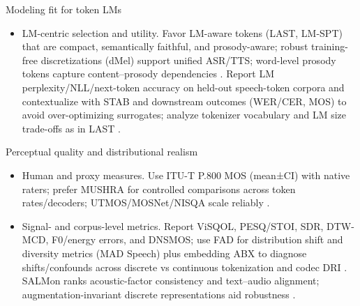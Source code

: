 \documentclass{article}
\begin{document}
Modeling fit for token LMs
\begin{itemize}
  \item LM-centric selection and utility. Favor LM-aware tokens (LAST, LM-SPT) that are compact, semantically faithful, and prosody-aware; robust training-free discretizations (dMel) support unified ASR/TTS; word-level prosody tokens capture content--prosody dependencies \cite{turetzky2024lastlanguagemodelawarespeechtokenization,jo2025lmsptalignedsemanticdistillationspeechto,bai2025dmelspeechtokenizationmadesimple,qian2025prosodylmuncoveringemergingprosodyproces}. Report LM perplexity/NLL/next-token accuracy on held-out speech-token corpora and contextualize with STAB and downstream outcomes (WER/CER, MOS) to avoid over-optimizing surrogates; analyze tokenizer vocabulary and LM size trade-offs as in LAST \cite{vashishth2024stabspeechtokenizerassessmentbenchmark,turetzky2024lastlanguagemodelawarespeechtokenization}.
\end{itemize}

Perceptual quality and distributional realism
\begin{itemize}
  \item Human and proxy measures. Use ITU-T P.800 MOS (mean±CI) with native raters; prefer MUSHRA for controlled comparisons across token rates/decoders; UTMOS/MOSNet/NISQA scale reliably \cite{nakata2024jchatjapaneselargescalespokendialoguecor,yang2025diffsoundstreamefficientspeechtokenizati}.
  \item Signal- and corpus-level metrics. Report ViSQOL, PESQ/STOI, SDR, DTW-MCD, F0/energy errors, and DNSMOS; use FAD for distribution shift and diversity metrics (MAD Speech) plus embedding ABX to diagnose shifts/confounds across discrete vs continuous tokenization and codec DRI \cite{fily2024establishingdegreesclosenessbetweenaudio,futeral2025madspeechmeasuresacousticdiversity,li2025continuousspeechtokenizertext,liu2024analyzingmitigatinginconsistencydiscrete}. SALMon ranks acoustic-factor consistency and text--audio alignment; augmentation-invariant discrete representations aid robustness \cite{maimon2025salmonsuiteacousticlanguagemodelevaluati,entry2025augmentationinvariantdiscreterepresentat}.
\end{itemize}
\end{document}
